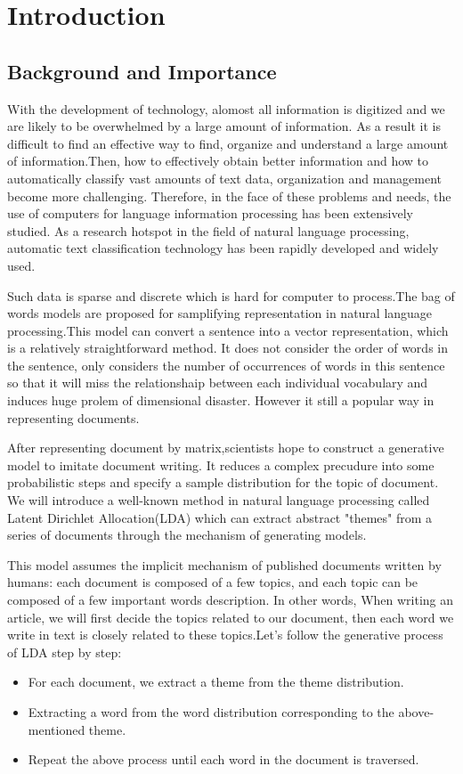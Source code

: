 \afterpage{\blankpage}

\chapter{Introduction}\label{s-intro}

\section{Background and Importance}
With the development of technology, alomost all information is digitized and we are  likely to be overwhelmed by a large amount of information. As a result it is difficult to find an effective way to find, organize and understand a large amount of information{\cite{intro-back}}.Then, how to effectively obtain better information and how to automatically classify vast amounts of text data, organization and management become more challenging. Therefore, in the face of these problems and needs, the use of computers for language information processing has been extensively studied. As a research hotspot in the field of natural language processing, automatic text classification technology has been rapidly developed and widely used.


Such data is sparse and discrete which is hard for computer to process.The bag of words models are proposed for samplifying representation in natural language processing.This model can convert a sentence into a vector representation, which is a relatively straightforward method. It does not consider the order of words in the sentence, only considers the number of occurrences of words  in this sentence so that it will miss the relationshaip between each individual vocabulary and induces huge prolem of dimensional disaster. However it still a popular way in representing documents.

After representing document by matrix,scientists hope to construct a generative model to
imitate document writing. It reduces a complex precudure into some probabilistic steps and specify a sample  distribution for the topic of  document\cite{find}. We will introduce  a  well-known method in natural language processing called Latent Dirichlet Allocation(LDA) which can extract  abstract "themes"  from a series of documents through the mechanism of generating models.


This model assumes the implicit mechanism of published documents written by humans: each document is composed of a few topics, and each topic can be composed of a few important words description. In other words, When writing an article, we will first decide the topics related to our document, then each word we write in text is closely related to these topics.Let's follow the generative process of LDA step by step:
\begin{itemize}
  \item For each document, we extract a theme from the theme distribution.
  \item Extracting a word from the word distribution corresponding to the above-mentioned theme.
  \item Repeat the above process until each word in the document is traversed.
\end{itemize}

